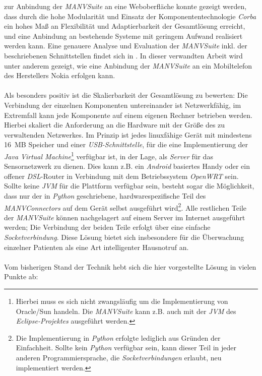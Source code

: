 zur Anbindung der \emph{MANVSuite} an eine Weboberfläche konnte gezeigt werden, dass durch die hohe Modularität
und Einsatz der Komponententechnologie \emph{Corba} ein hohes Maß an Flexibilität und Adaptierbarkeit der
Gesamtlösung erreicht, und eine Anbindung an bestehende Systeme mit geringem Aufwand realisiert werden kann.
Eine genauere Analyse und Evaluation der \emph{MANVSuite} inkl. der beschriebenen Schnittstellen findet sich
in \cite{Jan}. In dieser verwandten Arbeit wird unter anderem gezeigt, wie eine Anbindung der \emph{MANVSuite}
an ein Mobiltelefon des Herstellers Nokia erfolgen kann.\\
\\
Als besonders positiv ist die Skalierbarkeit der Gesamtlösung zu bewerten: Die Verbindung der einzelnen Komponenten 
untereinander ist Netzwerkfähig, im Extremfall kann jede
Komponente auf einem eigenen Rechner betrieben werden. Hierbei skaliert die Anforderung an die Hardware mit
der Größe des zu verwaltenden Netzwerkes. Im Prinzip ist jedes linuxfähige Gerät mit mindestens 16~MB Speicher
und einer \emph{USB-Schnittstelle}, für die eine Implementierung der \emph{Java Virtual Machine}\footnote{Hierbei muss
es sich nicht zwangsläufig um die Implementierung von Oracle/Sun handeln. Die \emph{MANVSuite} kann z.B. auch
mit der \emph{JVM} des \emph{Eclipse-Projektes} ausgeführt werden.} verfügbar ist, in der Lage, als \emph{Server}
für das Sensornetzwerk zu dienen. Dies kann z.B. ein \emph{Android} basiertes Handy oder ein offener
\emph{DSL}-Router in Verbindung mit dem Betriebssystem \emph{OpenWRT} sein. Sollte keine \emph{JVM} für die
Plattform verfügbar sein, besteht sogar die Möglichkeit, dass nur der in \emph{Python} geschriebene,
hardwarespezifische Teil des \emph{MANVConnectors} auf dem Gerät selbst ausgeführt wird\footnote{Die Implementierung
in \emph{Python} erfolgte lediglich aus Gründen der Einfachheit. Sollte kein \emph{Python} verfügbar sein,
kann dieser Teil in jeder anderen Programmiersprache, die \emph{Socketverbindungen} erlaubt, neu implementiert werden.}. 
Alle restlichen Teile der \emph{MANVSuite} können nachgelagert auf einem Server im Internet ausgeführt werden; 
Die Verbindung der beiden Teile erfolgt über eine einfache \emph{Socketverbindung}. Diese Lösung bietet sich insbesondere 
für die Überwachung einzelner Patienten als eine Art intelligenter Hausnotruf an.\\
\\
Vom bisherigen Stand der Technik hebt sich die hier vorgestellte Lösung in vielen Punkte ab:

